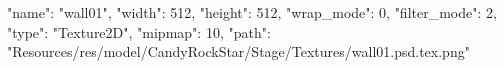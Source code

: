 {
  "name": "wall01",
  "width": 512,
  "height": 512,
  "wrap_mode": 0,
  "filter_mode": 2,
  "type": "Texture2D",
  "mipmap": 10,
  "path": "Resources/res/model/CandyRockStar/Stage/Textures/wall01.psd.tex.png"
}